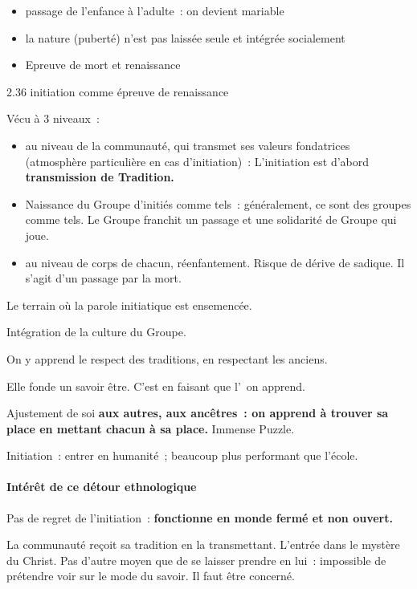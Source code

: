 \begin{itemize}
\item
  passage de l'enfance à l'adulte~: on devient mariable
\item
  la nature (puberté) n'est pas laissée seule et intégrée socialement
\item
  Epreuve de mort et renaissance
\end{itemize}

2.36 initiation comme épreuve de renaissance

Vécu à 3 niveaux~:

\begin{itemize}
\item
  au niveau de la communauté, qui transmet ses valeurs fondatrices
  (atmosphère particulière en cas d'initiation)~: L'initiation est
  d'abord \textbf{transmission de Tradition.}
\item
  Naissance du Groupe d'initiés comme tels~: généralement, ce sont des
  groupes comme tels. Le Groupe franchit un passage et une solidarité de
  Groupe qui joue.
\item
  au niveau de corps de chacun, réenfantement. Risque de dérive de
  sadique. Il s'agit d'un passage par la mort.
\end{itemize}

Le terrain où la parole initiatique est ensemencée.

Intégration de la culture du Groupe.

On y apprend le respect des traditions, en respectant les anciens.

Elle fonde un savoir être. C'est en faisant que l'~on apprend.

Ajustement de soi \textbf{aux autres, aux ancêtres~: on apprend à
trouver sa place en mettant chacun à sa place.} Immense Puzzle.

Initiation~: entrer en humanité~; beaucoup plus performant que l'école.

\hypertarget{intuxe9ruxeat-de-ce-duxe9tour-ethnologique}{%
\paragraph{Intérêt de ce détour
ethnologique}\label{intuxe9ruxeat-de-ce-duxe9tour-ethnologique}}

Pas de regret de l'initiation~: \textbf{fonctionne en monde fermé et non
ouvert.}

La communauté reçoit sa tradition en la transmettant. L'entrée dans le
mystère du Christ. Pas d'autre moyen que de se laisser prendre en lui~:
impossible de prétendre voir sur le mode du savoir. Il faut être
concerné.

